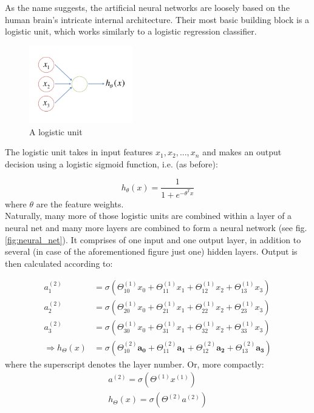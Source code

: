 \documentclass[a4paper, 11pt]{article}
\numberwithin{equation}{section}
\begin{document}
		As the name suggests, the artificial neural networks are loosely based on the human brain's intricate internal architecture. Their most basic building block is a logistic unit, which works similarly to a logistic regression classifier.
		
		\begin{figure}[!h]
			\centering
			\includegraphics[page=1,width=0.40\textwidth]{logistic_unit.pdf}
			\caption{\label{fig:logistic_unit}{A logistic unit}}
		\end{figure}
		
		The logistic unit takes in input features $x_1, x_2, ..., x_n$ and makes an output decision using a logistic sigmoid function, i.e. (as before):
		
		\begin{equation}
		h_\theta (x) = \frac{1}{1+e^{-\theta ^ T x}}
		\end{equation}
		where $\theta$ are the feature weights.\\
		
		Naturally, many more of those logistic units are combined within a layer of a neural net and many more layers are combined to form a neural network (see fig. \ref{fig:neural_net}). It comprises of one input and one output layer, in addition to several (in case of the aforementioned figure just one) hidden layers. Output is then calculated according to:
		
		\begin{align}
		a_1^{(2)} &= \sigma (\Theta_{10}^{(1)} x_0 + \Theta_{11}^{(1)} x_1  + \Theta_{12}^{(1)} x_2  + \Theta_{13}^{(1)} x_3) \\
		a_2^{(2)} &= \sigma (\Theta_{20}^{(1)} x_0 + \Theta_{21}^{(1)} x_1  + \Theta_{22}^{(1)} x_2  + \Theta_{23}^{(1)} x_3) \\
		a_3^{(2)} &= \sigma (\Theta_{30}^{(1)} x_0 + \Theta_{31}^{(1)} x_1  + \Theta_{32}^{(1)} x_2  + \Theta_{33}^{(1)} x_3) \\
		\Rightarrow h_{\Theta} (x) &= \sigma (\Theta_{10}^{(2)} \boldsymbol{a_0} + \Theta_{11}^{(2)} \boldsymbol{a_1}  + \Theta_{12}^{(2)} \boldsymbol{a_2}  + \Theta_{13}^{(2)} \boldsymbol{a_3})
		\end{align}
		where the superscript denotes the layer number. Or, more compactly:
		\begin{align}
		a^{(2)} = \sigma(\Theta^{(1)} x^{(1)}) \\
		h_{\Theta}(x) = \sigma(\Theta^{(2)} a^{(2)})
		\end{align}
		
\end{document}
